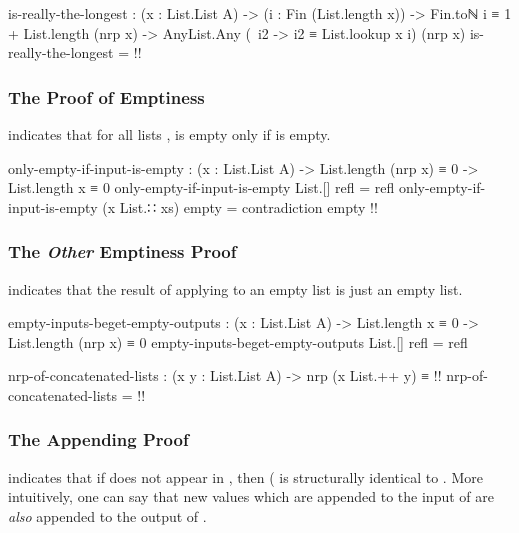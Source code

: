 \documentclass{report}
\begin{document}
\begin{code}
  is-really-the-longest :
    (x : List.List A) ->
    (i : Fin (List.length x)) ->
    Fin.toℕ i ≡ 1 + List.length (nrp x) ->
    AnyList.Any (\ i2 -> i2 ≡ List.lookup x i) (nrp x)
  is-really-the-longest = {!!}
\end{code}

\subsubsection{The Proof of Emptiness}
 indicates that for all lists ,   is empty only if  is empty.

\begin{code}
  only-empty-if-input-is-empty :
    (x : List.List A) ->
    List.length (nrp x) ≡ 0 ->
    List.length x ≡ 0
  only-empty-if-input-is-empty List.[] refl = refl
  only-empty-if-input-is-empty (x List.∷ xs) empty = contradiction empty {!!}
\end{code}

\subsubsection{The \emph{Other} Emptiness Proof}
 indicates that the result of applying  to an empty list is just an empty list.

\begin{code}
  empty-inputs-beget-empty-outputs :
    (x : List.List A) ->
    List.length x ≡ 0 ->
    List.length (nrp x) ≡ 0
  empty-inputs-beget-empty-outputs List.[] refl = refl
\end{code}

\begin{code}
  nrp-of-concatenated-lists :
    (x y : List.List A) ->
    nrp (x List.++ y) ≡ {!!}
  nrp-of-concatenated-lists = {!!}
\end{code}

\subsubsection{The Appending Proof}
 indicates that if  does not appear in , then  \AgdaSymbol(  \AgdaOperator{\AgdaFunction{List.[}}  \AgdaOperator{\AgdaFunction{]}} is structurally identical to    \AgdaOperator{\AgdaFunction{List.[}}  \AgdaOperator{\AgdaFunction{]}}.  More intuitively, one can say that new values which are appended to the input of  are \emph{also} appended to the output of .
\end{document}
